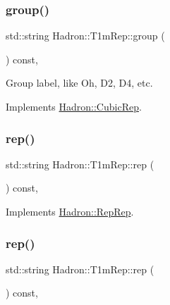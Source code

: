 \subsubsection{\texorpdfstring{group()}{group()}\hspace{0.1cm}{\footnotesize\ttfamily [3/3]}}
{\footnotesize\ttfamily std\+::string Hadron\+::\+T1m\+Rep\+::group (\begin{DoxyParamCaption}{ }\end{DoxyParamCaption}) const\hspace{0.3cm}{\ttfamily [inline]}, {\ttfamily [virtual]}}

Group label, like Oh, D2, D4, etc. 

Implements \mbox{\hyperlink{structHadron_1_1CubicRep_a0748f11ec87f387062c8e8981339a29c}{Hadron\+::\+Cubic\+Rep}}.

\mbox{\label{structHadron_1_1T1mRep_ae8b584d4fdf7f81112d718a300fdbf5b}} 
\subsubsection{\texorpdfstring{rep()}{rep()}\hspace{0.1cm}{\footnotesize\ttfamily [1/5]}}
{\footnotesize\ttfamily std\+::string Hadron\+::\+T1m\+Rep\+::rep (\begin{DoxyParamCaption}{ }\end{DoxyParamCaption}) const\hspace{0.3cm}{\ttfamily [inline]}, {\ttfamily [virtual]}}



Implements \mbox{\hyperlink{structHadron_1_1RepRep_ab3213025f6de249f7095892109575fde}{Hadron\+::\+Rep\+Rep}}.

\mbox{\label{structHadron_1_1T1mRep_ae8b584d4fdf7f81112d718a300fdbf5b}} 
\subsubsection{\texorpdfstring{rep()}{rep()}\hspace{0.1cm}{\footnotesize\ttfamily [2/5]}}
{\footnotesize\ttfamily std\+::string Hadron\+::\+T1m\+Rep\+::rep (\begin{DoxyParamCaption}{ }\end{DoxyParamCaption}) const\hspace{0.3cm}{\ttfamily [inline]}, {\ttfamily [virtual]}}



